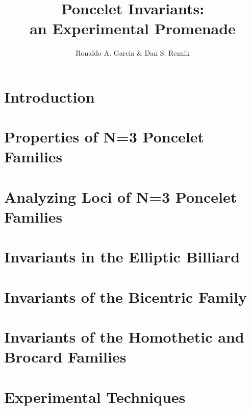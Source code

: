 \documentclass{book}
\begin{document}
\title{Poncelet Invariants:\\an Experimental Promenade}
\author{Ronaldo A. Garcia \& Dan S. Reznik} 
\maketitle

\chapter{Introduction}
\label{chap:01-intro}


%

\chapter{Properties of N=3 Poncelet Families}
\label{chap:03-n3-properties}


\chapter{Analyzing Loci of N=3 Poncelet Families}
\label{chap:04-n3-loci}


\chapter[Billiard Invariants]{Invariants in the Elliptic Billiard}
\label{chap:05-billiard}

\chapter[Bicentric Invariants]{Invariants of the Bicentric Family}
\label{chap:06-bicentric}
%

\chapter[Homothetic and Brocard Invariants]{Invariants of the Homothetic and Brocard Families}
\label{chap:07-homoth}
%

\chapter{Experimental Techniques}
\label{chap:08-experimental}
%
\end{document}

